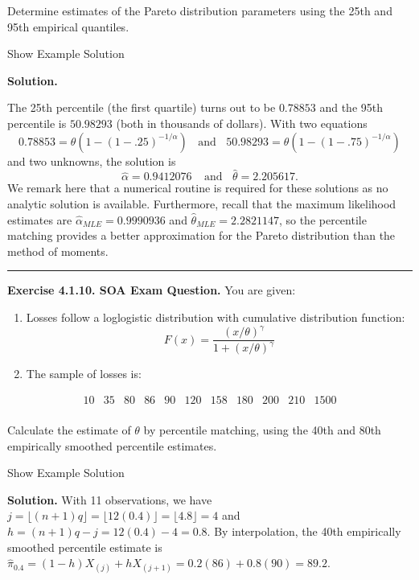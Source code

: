 \documentclass[]{book}
\providecommand{\tightlist}{%
  \setlength{\itemsep}{0pt}\setlength{\parskip}{0pt}}
\theoremstyle{definition}
\theoremstyle{definition}
\theoremstyle{definition}
\theoremstyle{remark}
\begin{document}
Determine estimates of the Pareto distribution parameters using the 25th
and 95th empirical quantiles.

Show Example Solution

\hypertarget{toggleExampleSelect.1.9}{}
\textbf{Solution.}

The 25th percentile (the first quartile) turns out to be \(0.78853\) and
the 95th percentile is \(50.98293\) (both in thousands of dollars). With
two equations
\[0.78853 = \theta \left( 1- (1-.25)^{-1/\alpha} \right) \ \ \ \ \text{and} \ \ \ \ 50.98293 = \theta \left( 1- (1-.75)^{-1/\alpha} \right)\]
and two unknowns, the solution is
\[\hat{\alpha} = 0.9412076 \ \ \ \ \ \text{and} \ \ \ \
\hat{\theta} = 2.205617 .\] We remark here that a numerical routine is
required for these solutions as no analytic solution is available.
Furthermore, recall that the maximum likelihood estimates are
\(\hat{\alpha}_{MLE} = 0.9990936\) and
\(\hat{\theta}_{MLE} = 2.2821147\), so the percentile matching provides
a better approximation for the Pareto distribution than the method of
moments.

\begin{center}\rule{0.5\linewidth}{\linethickness}\end{center}

\textbf{Exercise 4.1.10. SOA Exam Question.} You are given:

\begin{enumerate}
\def\labelenumi{(\roman{enumi})}
\tightlist
\item
  Losses follow a loglogistic distribution with cumulative distribution
  function:
  \[F(x) = \frac{\left(x/\theta\right)^{\gamma}}{1+\left(x/\theta\right)^{\gamma}}\]
\item
  The sample of losses is:
\end{enumerate}

\[\begin{array}{ccccccccccc}
10 &35 &80 &86 &90 &120 &158 &180 &200 &210 &1500 \\
\end{array}\]

Calculate the estimate of \(\theta\) by percentile matching, using the
40th and 80th empirically smoothed percentile estimates.

Show Example Solution

\hypertarget{toggleExampleSelect.1.10}{}
\textbf{Solution.} With 11 observations, we have
\(j=\lfloor(n+1)q\rfloor = \lfloor 12(0.4) \rfloor = \lfloor 4.8\rfloor=4\)
and \(h=(n+1)q-j = 12(0.4)-4=0.8\). By interpolation, the 40th
empirically smoothed percentile estimate is
\(\hat{\pi}_{0.4} = (1-h) X_{(j)} + h X_{(j+1)} = 0.2(86)+0.8(90)=89.2\).
\end{document}

